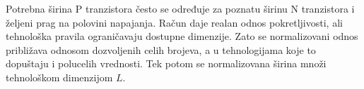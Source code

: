Potrebna širina P tranzistora često se određuje za poznatu širinu N tranzistora i željeni prag na polovini napajanja. Račun daje realan odnos pokretljivosti, ali tehnološka pravila ograničavaju dostupne dimenzije. Zato se normalizovani odnos približava odnosom dozvoljenih celih brojeva, a u tehnologijama koje to dopuštaju i polucelih vrednosti. Tek potom se normalizovana širina množi tehnološkom dimenzijom $L$.
